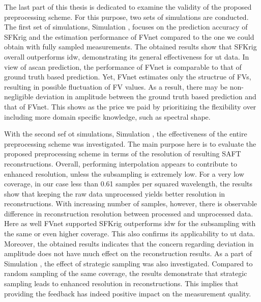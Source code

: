 The last part of this thesis is dedicated to examine the validity of the proposed preprocessing scheme. For this purpose, two sets of simulations are conducted. %
The first set of simulations, Simulation , focuses on the prediction accuracy of \acrshort{SFKrig} and the estimation performance of \gls{FVnet} compared to the one we could obtain with fully sampled measurements. The obtained results show that \acrshort*{SFKrig} overall outperforms \acrshort{idw}, demonstrating its general effectiveness for \acrshort*{ut} data. In view of \gls*{ascan} prediction, the performance of \gls*{FVnet} is comparable to that of ground truth based prediction. Yet, \gls*{FVnet} estimates only the structrue of \glspl*{FV}, resulting in possible fluctuation of \gls{FV} values. As a result, there may be non-negligible deviation in amplitude between the ground truth based prediction and that of \gls*{FVnet}. This shows as the price we paid by prioritizing the flexibility over including more domain specific knowledge, such as spectral shape. \par

With the second sef ot simulations, Simulation , the effectiveness of the entire preprocessing scheme was investigated. The main purpose here is to evaluate the proposed preprocessing scheme in terms of the resolution of resulting \acrshort{SAFT} reconstructions. Overall, performing interpolation appears to contribute to enhanced resolution, unless the subsampling is extremely low. For a very low coverage, in our case less than 0.61 samples per squared wavelength, the results show that keeping the raw data unprocessed yields better resolution in reconstructions. With increasing number of samples, however, there is observable difference in reconstruction resolution between processed and unprocessed data. Here as well \gls*{FVnet} supported \acrshort*{SFKrig} outperforms \acrshort*{idw} for the subsampling with the same or even higher coverage. This also confirms its applicability to \acrshort*{ut} data. Moreover, the obtained results indicates that the concern regarding deviation in amplitude does not have much effect on the reconstruction results. As a part of Simulation , the effect of strategic sampling was also investigated. Compared to random sampling of the same coverage, the results demonstrate that strategic sampling leads to enhanced resolution in reconstructions. This implies that providing the feedback has indeed positive impact on the measurement quality. \par

